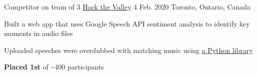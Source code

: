 \begin{cventries}
  \cventry
    {Competitor on team of 3} %
    {\href{https://hackthevalley.io/}{Hack the Valley} 4} %
    {Feb. 2020} %
    {Toronto, Ontario, Canada} %
    {
      \begin{cvitems} %
        \item{Built a web app that uses Google Speech API sentiment analysis to identify key moments in audio files}
        \item{Uploaded speeches were overdubbed with matching music using \href{https://pypi.org/project/pydub/}{a Python library}}
        \item {\textbf{Placed 1st}  of \textasciitilde 400 participants}
      \end{cvitems}
    }

\end{cventries}
